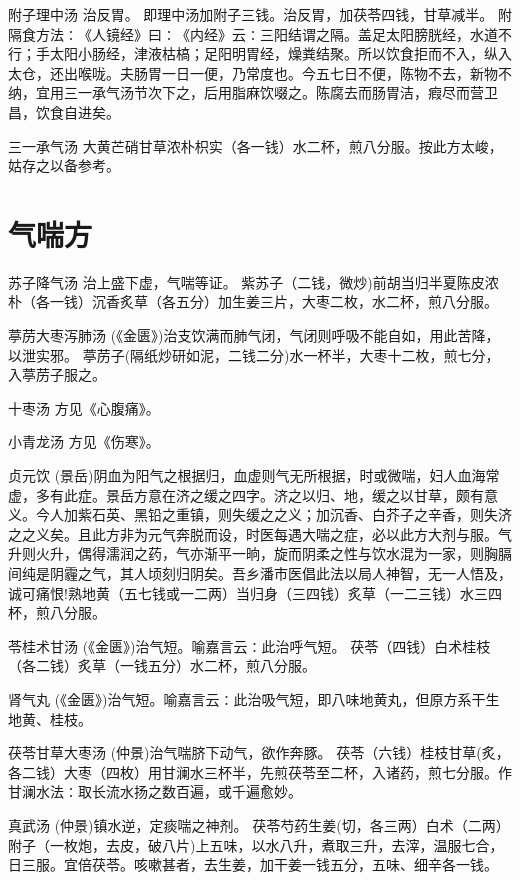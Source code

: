 \documentclass[a4paper,12pt,UTF8,twoside]{ctexbook}
\begin{document}
    附子理中汤
    治反胃。
    即理中汤加附子三钱。治反胃，加茯苓四钱，甘草减半。
    附隔食方法∶《人镜经》曰∶《内经》云∶三阳结谓之隔。盖足太阳膀胱经，水道不行；手太阳小肠经，津液枯槁；足阳明胃经，燥粪结聚。所以饮食拒而不入，纵入太仓，还出喉咙。夫肠胃一日一便，乃常度也。今五七日不便，陈物不去，新物不纳，宜用三一承气汤节次下之，后用脂麻饮啜之。陈腐去而肠胃洁，瘕尽而营卫昌，饮食自进矣。
    
    三一承气汤
    大黄芒硝甘草浓朴枳实（各一钱）水二杯，煎八分服。按此方太峻，姑存之以备参考。
    
	\section{气喘方}
	
	苏子降气汤
	治上盛下虚，气喘等证。
	紫苏子（二钱，微炒)前胡当归半夏陈皮浓朴（各一钱）沉香炙草（各五分）加生姜三片，大枣二枚，水二杯，煎八分服。
	
	葶苈大枣泻肺汤
	(《金匮》)治支饮满而肺气闭，气闭则呼吸不能自如，用此苦降，以泄实邪。
	葶苈子(隔纸炒研如泥，二钱二分)水一杯半，大枣十二枚，煎七分，入葶苈子服之。
	
	十枣汤
	方见《心腹痛》。
	
	小青龙汤
	方见《伤寒》。
	
	贞元饮
	(景岳)阴血为阳气之根据归，血虚则气无所根据，时或微喘，妇人血海常虚，多有此症。景岳方意在济之缓之四字。济之以归、地，缓之以甘草，颇有意义。今人加紫石英、黑铅之重镇，则失缓之之义；加沉香、白芥子之辛香，则失济之之义矣。且此方非为元气奔脱而设，时医每遇大喘之症，必以此方大剂与服。气升则火升，偶得濡润之药，气亦渐平一晌，旋而阴柔之性与饮水混为一家，则胸膈间纯是阴霾之气，其人顷刻归阴矣。吾乡潘市医倡此法以局人神智，无一人悟及，诚可痛恨!熟地黄（五七钱或一二两）当归身（三四钱）炙草（一二三钱）水三四杯，煎八分服。
	
	苓桂术甘汤
	(《金匮》)治气短。喻嘉言云∶此治呼气短。
	茯苓（四钱）白术桂枝（各二钱）炙草（一钱五分）水二杯，煎八分服。
	
	肾气丸
	(《金匮》)治气短。喻嘉言云∶此治吸气短，即八味地黄丸，但原方系干生地黄、桂枝。
	
	茯苓甘草大枣汤
	(仲景)治气喘脐下动气，欲作奔豚。
	茯苓（六钱）桂枝甘草(炙，各二钱）大枣（四枚）用甘澜水三杯半，先煎茯苓至二杯，入诸药，煎七分服。作甘澜水法∶取长流水扬之数百遍，或千遍愈妙。
	
	真武汤
	(仲景)镇水逆，定痰喘之神剂。
	茯苓芍药生姜(切，各三两）白术（二两）附子（一枚炮，去皮，破八片)上五味，以水八升，煮取三升，去滓，温服七合，日三服。宜倍茯苓。咳嗽甚者，去生姜，加干姜一钱五分，五味、细辛各一钱。
	
\end{document}

